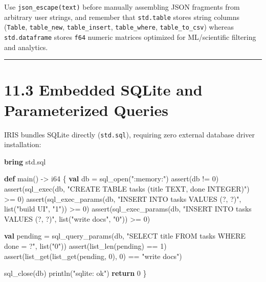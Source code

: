 \documentclass[
  english,
  oneside]{book}
\newenvironment{Shaded}{\begin{snugshade}}{\end{snugshade}}
\newcommand{\ControlFlowTok}[1]{\textcolor[rgb]{0.77,0.53,0.75}{\textbf{#1}}}
\newcommand{\DataTypeTok}[1]{\textcolor[rgb]{0.31,0.79,0.69}{#1}}
\newcommand{\DecValTok}[1]{\textcolor[rgb]{0.71,0.81,0.66}{#1}}
\newcommand{\FunctionTok}[1]{\textcolor[rgb]{0.86,0.86,0.67}{#1}}
\newcommand{\KeywordTok}[1]{\textcolor[rgb]{0.34,0.61,0.84}{\textbf{#1}}}
\newcommand{\NormalTok}[1]{\textcolor[rgb]{0.83,0.83,0.83}{#1}}
\newcommand{\OperatorTok}[1]{\textcolor[rgb]{0.83,0.83,0.83}{#1}}
\newcommand{\StringTok}[1]{\textcolor[rgb]{0.81,0.57,0.47}{#1}}
\begin{document}
Use \texttt{json\_escape(text)} before manually assembling JSON
fragments from arbitrary user strings, and remember that
\texttt{std.table} stores string columns (\texttt{Table},
\texttt{table\_new}, \texttt{table\_insert}, \texttt{table\_where},
\texttt{table\_to\_csv}) whereas \texttt{std.dataframe} stores
\texttt{f64} numeric matrices optimized for ML/scientific filtering and
analytics.

\begin{center}\rule{0.5\linewidth}{0.5pt}\end{center}

\section{11.3 Embedded SQLite and Parameterized
Queries}\label{embedded-sqlite-and-parameterized-queries}

IRIS bundles SQLite directly (\texttt{std.sql}), requiring zero external
database driver installation:

\begin{Shaded}
\begin{Highlighting}[]
\KeywordTok{bring}\NormalTok{ std}\OperatorTok{.}\NormalTok{sql}

\KeywordTok{def}\NormalTok{ main() }\OperatorTok{{-}\textgreater{}} \DataTypeTok{i64}\NormalTok{ \{}
    \KeywordTok{val}\NormalTok{ db }\OperatorTok{=}\NormalTok{ sql\_open(}\StringTok{":memory:"}\NormalTok{)}
    \FunctionTok{assert}\NormalTok{(db }\OperatorTok{!=} \DecValTok{0}\NormalTok{)}
    \FunctionTok{assert}\NormalTok{(sql\_exec(db, }\StringTok{"CREATE TABLE tasks (title TEXT, done INTEGER)"}\NormalTok{) }\OperatorTok{\textgreater{}=} \DecValTok{0}\NormalTok{)}
    \FunctionTok{assert}\NormalTok{(sql\_exec\_params(db, }\StringTok{"INSERT INTO tasks VALUES (?, ?)"}\NormalTok{, }\DataTypeTok{list}\NormalTok{(}\StringTok{"build UI"}\NormalTok{, }\StringTok{"1"}\NormalTok{)) }\OperatorTok{\textgreater{}=} \DecValTok{0}\NormalTok{)}
    \FunctionTok{assert}\NormalTok{(sql\_exec\_params(db, }\StringTok{"INSERT INTO tasks VALUES (?, ?)"}\NormalTok{, }\DataTypeTok{list}\NormalTok{(}\StringTok{"write docs"}\NormalTok{, }\StringTok{"0"}\NormalTok{)) }\OperatorTok{\textgreater{}=} \DecValTok{0}\NormalTok{)}

    \KeywordTok{val}\NormalTok{ pending }\OperatorTok{=}\NormalTok{ sql\_query\_params(db, }\StringTok{"SELECT title FROM tasks WHERE done = ?"}\NormalTok{, }\DataTypeTok{list}\NormalTok{(}\StringTok{"0"}\NormalTok{))}
    \FunctionTok{assert}\NormalTok{(}\FunctionTok{list\_len}\NormalTok{(pending) }\OperatorTok{==} \DecValTok{1}\NormalTok{)}
    \FunctionTok{assert}\NormalTok{(}\FunctionTok{list\_get}\NormalTok{(}\FunctionTok{list\_get}\NormalTok{(pending, }\DecValTok{0}\NormalTok{), }\DecValTok{0}\NormalTok{) }\OperatorTok{==} \StringTok{"write docs"}\NormalTok{)}

\NormalTok{    sql\_close(db)}
\NormalTok{    println(}\StringTok{"sqlite: ok"}\NormalTok{)}
    \ControlFlowTok{return} \DecValTok{0}
\NormalTok{\}}
\end{Highlighting}
\end{Shaded}
\end{document}
